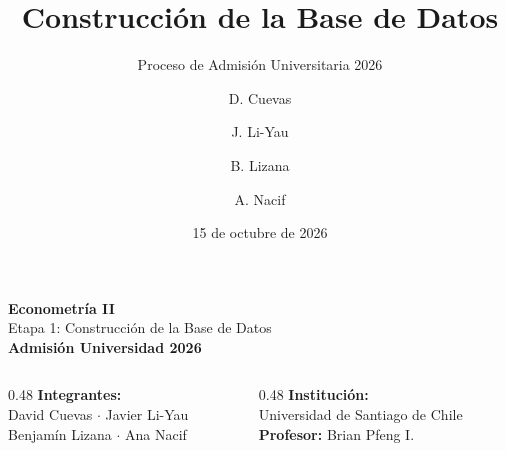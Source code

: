 \documentclass[10pt, aspectratio=169, xcolor=table]{beamer}
\title[Econometría II -- Etapa 1]{\textbf{Construcción de la Base de Datos}}
\subtitle{Proceso de Admisión Universitaria 2026}
\author[Cuevas, Li-Yau, Lizana, Nacif]{D. Cuevas \and J. Li-Yau \and B. Lizana \and A. Nacif}
\institute{Universidad de Santiago de Chile \\ \textbf{Profesor:} Brian Pfeng Ibacache}
\date{15 de octubre de 2026}
\begin{document}
{
\begin{frame}[plain]
  \begin{center}
    \vspace*{0.2cm}
    \begin{tcolorbox}[colback=USACHNavy,colframe=USACHNavy,arc=6pt,center]
      \centering
      {\Huge \color{white} \textbf{Econometría II}}\\[0.2cm]
      {\large \color{white!90!USACHTeal} Etapa 1: Construcción de la Base de Datos}\\[0.1cm]
      {\small \color{USACHOrange} \textbf{Admisión Universidad 2026}}
    \end{tcolorbox}

    \vspace{0.8cm}

    \begin{columns}[t]
      \begin{column}{0.48\textwidth}
        \small
        \textbf{\textcolor{USACHNavy}{Integrantes:}}\\
        \textcolor{DarkText}{David Cuevas $\cdot$ Javier Li-Yau}\\
        \textcolor{DarkText}{Benjamín Lizana $\cdot$ Ana Nacif}
      \end{column}
      \begin{column}{0.48\textwidth}
        \small \raggedleft
        \textbf{\textcolor{USACHNavy}{Institución:}}\\
        \textcolor{DarkText}{Universidad de Santiago de Chile}\\
        \textbf{\textcolor{USACHNavy}{Profesor:}} \textcolor{DarkText}{Brian Pfeng I.}
      \end{column}
    \end{columns}
  \end{center}
\end{frame}
}
\end{document}
